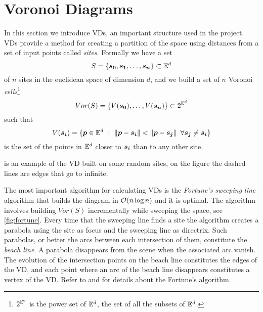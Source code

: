 \documentclass[dissertation.tex]{subfiles}
\begin{document}
\section{Voronoi Diagrams}\label{sec:voronoi}
In this section we introduce \acfp{VD}, an important structure used in
the project. \acp{VD} \cite{deberg} provide a method for creating a
partition of the
space using distances from a set of input points called
\emph{sites}. Formally we have a set
\begin{equation*}
  S=\{\boldsymbol{s_0},\boldsymbol{s_1},\dots,\boldsymbol{s_n}\} \subset \mathbb{E}^d
\end{equation*}
of $n$ sites in the euclidean space of dimension $d$, and we build a
set of $n$ Voronoi \emph{cells}\footnote{$2^{\mathbb{E}^d}$ is the power set of
  $\mathbb{E}^d$, the set of all the subsets of $\mathbb{E}^d$.}
\begin{equation*}
  Vor(S)=\{V(\boldsymbol{s_0}),\dots,V(\boldsymbol{s_n})\}\subset 2^{\mathbb{E}^d}
\end{equation*}
such that
\begin{equation*}
  V(\boldsymbol{\boldsymbol{s_i}})=\{\boldsymbol{p}\in\mathbb{E}^d\ :\
  \left\lVert\boldsymbol{p}-\boldsymbol{s_i}\right\rVert<\left\lVert\boldsymbol{p}-\boldsymbol{s_j}\right\rVert\ \forall \boldsymbol{s_j}\neq\boldsymbol{s_i}\}
\end{equation*}
is the set of the points in $\mathbb{E}^d$ closer to $\boldsymbol{s_i}$ than to any
other site.

\Cref{fig:voronoi} is an example of the \ac{VD} built on some random
sites, on the figure the dashed lines are edges that go to infinite.

The most important algorithm for
calculating \acp{VD} is the \emph{Fortune's}
\emph{sweeping line} algorithm that builds the diagram in $\mathcal{O}(n\log
n)$ and it is optimal. The algorithm involves building $Vor(S)$
incrementally while sweeping the space, see \cref{fig:fortune}. Every
time that the sweeping
line finds a site the algorithm creates a parabola using the site as
focus and the sweeping line as directrix. Such parabolas, or better
the arcs between each intersection of them, constitute
the \emph{beach line}. A parabola disappears from the scene when the
associated
arc vanish. The evolution of the intersection points on the beach line
constitutes the edges of the \ac{VD}, and each point where an arc of
the beach line disappears constitutes a vertex of the \ac{VD}.
Refer to \cite{deberg} and
\cite{fortune} for details about the Fortune's algorithm.
\end{document}
